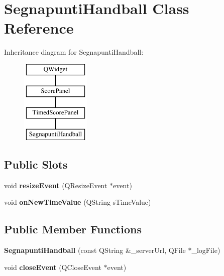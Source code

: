 \hypertarget{classSegnapuntiHandball}{}\section{Segnapunti\+Handball Class Reference}
\label{classSegnapuntiHandball}
Inheritance diagram for Segnapunti\+Handball\+:\begin{figure}[H]
\begin{center}
\leavevmode
\includegraphics[height=4.000000cm]{d8/d8a/classSegnapuntiHandball}
\end{center}
\end{figure}
\subsection*{Public Slots}
\begin{DoxyCompactItemize}
\item 
\mbox{\label{classSegnapuntiHandball_ab5f75180cb963fdc1d19899735affde9}} 
void {\bfseries resize\+Event} (Q\+Resize\+Event $\ast$event)
\item 
\mbox{\label{classSegnapuntiHandball_aba98f1f92c4eb20e1abf74d35dbefd98}} 
void {\bfseries on\+New\+Time\+Value} (Q\+String s\+Time\+Value)
\end{DoxyCompactItemize}
\subsection*{Public Member Functions}
\begin{DoxyCompactItemize}
\item 
\mbox{\label{classSegnapuntiHandball_ad5df698516333979e51f437d51a54b11}} 
{\bfseries Segnapunti\+Handball} (const Q\+String \&\+\_\+server\+Url, Q\+File $\ast$\+\_\+log\+File)
\item 
\mbox{\label{classSegnapuntiHandball_a1200027eefb42a1e69edaad2349190d4}} 
void {\bfseries close\+Event} (Q\+Close\+Event $\ast$event)
\end{DoxyCompactItemize}
